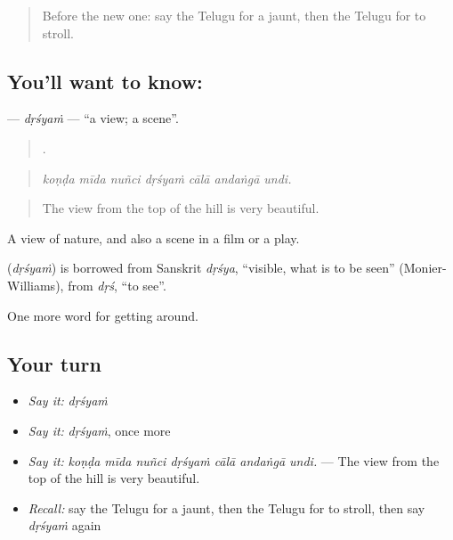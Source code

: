\label{lesson:TE-C456-drsyam}



\begin{quote}
Before the new one: say the Telugu for a jaunt, then the Telugu for to stroll.
\end{quote}

\subsection*{You'll want to know: }
\textbf{} — \emph{dṛśyaṁ} — \textquotedblleft{}a view; a scene\textquotedblright{}.

\begin{quote}
      .
\end{quote}

\begin{quote}
\emph{koṇḍa mīda nuñci dṛśyaṁ cālā andaṅgā undi.}
\end{quote}

\begin{quote}
The view from the top of the hill is very beautiful.
\end{quote}

A view of nature, and also a scene in a film or a play.

\begin{cousinweb}
\textbf{} (\emph{dṛśyaṁ}) is borrowed from Sanskrit \emph{dṛśya}, \textquotedblleft{}visible, what is to be seen\textquotedblright{} (Monier-Williams), from \emph{dṛś}, \textquotedblleft{}to see\textquotedblright{}.
\end{cousinweb}

\begin{grammarlens}[title={What you've built}]
One more word for getting around.
\end{grammarlens}

\subsection*{Your turn}
\begin{itemize}
\raggedright
  \item \emph{Say it:} \emph{dṛśyaṁ}
  \item \emph{Say it:} \emph{dṛśyaṁ}, once more
  \item \emph{Say it:} \emph{koṇḍa mīda nuñci dṛśyaṁ cālā andaṅgā undi.} — The view from the top of the hill is very beautiful.
  \item \emph{Recall:} say the Telugu for a jaunt, then the Telugu for to stroll, then say \emph{dṛśyaṁ} again
\end{itemize}

